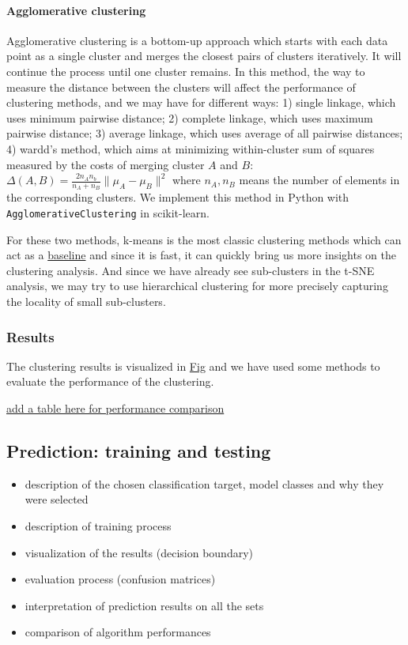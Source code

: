 \documentclass{article}
\begin{document}
\paragraph{Agglomerative clustering} Agglomerative clustering is a bottom-up approach which starts with each data point as a single cluster and merges the closest pairs of clusters iteratively. It will continue the process until one cluster remains. In this method, the way to measure the distance between the clusters will affect the performance of clustering methods, and we may have for different ways: 1) single linkage, which uses minimum pairwise distance; 2) complete linkage,
which uses maximum pairwise distance; 3) average linkage, which uses average of all pairwise distances; 4) wardd's method, which aims at minimizing within-cluster sum of squares measured by the costs of merging cluster $A$ and $B$: $\Delta(A, B)=\frac{2n_An_b}{n_A+n_B}\|\mu_A-\mu_B\|^2$ where $n_A, n_B$ means the number of elements in the corresponding clusters. We implement this method in Python with \texttt{AgglomerativeClustering} in scikit-learn.

For these two methods, k-means is the most classic clustering methods which can act as a \underline{baseline} and since it is fast, it can quickly bring us more insights on the clustering analysis. And since we have already see sub-clusters in the t-SNE analysis, we may try to use hierarchical clustering for more precisely capturing the locality of small sub-clusters.

\subsubsection*{Results}

The clustering results is visualized in \underline{Fig} and we have used some methods to evaluate the performance of the clustering.

\underline{add a table here for performance comparison}

\subsection{Prediction: training and testing}

\begin{itemize}
    \item description of the chosen classification target, model classes and why they were selected
    \item description of training process
    \item visualization of the results (decision boundary)
    \item evaluation process (confusion matrices)
    \item interpretation of prediction results on all the sets
    \item comparison of algorithm performances
\end{itemize}
\end{document}
